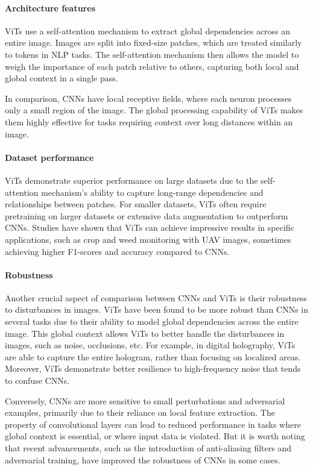 \paragraph{Architecture features}

ViTs use a self-attention mechanism to extract global dependencies across an entire image. Images are split into fixed-size patches, which are treated similarly to tokens in NLP tasks. The self-attention mechanism then allows the model to weigh the importance of each patch relative to others, capturing both local and global context in a single pass. 

In comparison, CNNs have local receptive fields, where each neuron processes only a small region of the image. The global processing capability of ViTs makes them highly effective for tasks requiring context over long distances within an image.

\paragraph{Dataset performance}

ViTs demonstrate superior performance on large datasets due to the self-attention mechanism's ability to capture long-range dependencies and relationships between patches. For smaller datasets, ViTs often require pretraining on larger datasets or extensive data augmentation to outperform CNNs. Studies have shown that ViTs can achieve impressive results in specific applications, such as crop and weed monitoring with UAV images, sometimes achieving higher F1-scores and accuracy compared to CNNs.

\paragraph{Robustness}

Another crucial aspect of comparison between CNNs and ViTs is their robustness to disturbances in images. ViTs have been found to be more robust than CNNs in several tasks due to their ability to model global dependencies across the entire image. This global context allows ViTs to better handle the disturbances in images, such as noise, occlusions, etc. For example, in digital holography, ViTs are able to capture the entire hologram, rather than focusing on localized areas. Moreover, ViTs demonstrate better resilience to high-frequency noise that tends to confuse CNNs.

Conversely, CNNs are more sensitive to small perturbations and adversarial examples, primarily due to their reliance on local feature extraction. The property of convolutional layers can lead to reduced performance in tasks where global context is essential, or where input data is violated. But it is worth noting that recent advancements, such as the introduction of anti-aliasing filters and adversarial training, have improved the robustness of CNNs in some cases.

